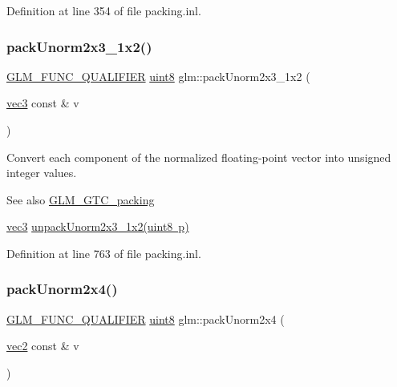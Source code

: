 Definition at line 354 of file packing.\+inl.

\mbox{\label{group__gtc__packing_ga0acca4eb99c300fe2edeef7ebd8fa08b}} 
\subsubsection{\texorpdfstring{packUnorm2x3\_1x2()}{packUnorm2x3\_1x2()}}
{\footnotesize\ttfamily \mbox{\hyperlink{setup_8hpp_a33fdea6f91c5f834105f7415e2a64407}{G\+L\+M\+\_\+\+F\+U\+N\+C\+\_\+\+Q\+U\+A\+L\+I\+F\+I\+ER}} \mbox{\hyperlink{group__gtc__type__precision_ga1a7dcd8aac97cc8020817c94049deff2}{uint8}} glm\+::pack\+Unorm2x3\+\_\+1x2 (\begin{DoxyParamCaption}\item[{\mbox{\hyperlink{group__core__types_ga1c47e8b3386109bc992b6c48e91b0be7}{vec3}} const \&}]{v }\end{DoxyParamCaption})}

Convert each component of the normalized floating-\/point vector into unsigned integer values.

\begin{DoxySeeAlso}{See also}
\mbox{\hyperlink{group__gtc__packing}{G\+L\+M\+\_\+\+G\+T\+C\+\_\+packing}} 

\mbox{\hyperlink{group__core__types_ga1c47e8b3386109bc992b6c48e91b0be7}{vec3}} \mbox{\hyperlink{group__gtc__packing_gaeeacc5275329100c50fe8fc0871eb423}{unpack\+Unorm2x3\+\_\+1x2(uint8 p)}} 
\end{DoxySeeAlso}


Definition at line 763 of file packing.\+inl.

\mbox{\label{group__gtc__packing_gad68eb2f848ba867192b8787998c0595a}} 
\subsubsection{\texorpdfstring{packUnorm2x4()}{packUnorm2x4()}}
{\footnotesize\ttfamily \mbox{\hyperlink{setup_8hpp_a33fdea6f91c5f834105f7415e2a64407}{G\+L\+M\+\_\+\+F\+U\+N\+C\+\_\+\+Q\+U\+A\+L\+I\+F\+I\+ER}} \mbox{\hyperlink{group__gtc__type__precision_ga1a7dcd8aac97cc8020817c94049deff2}{uint8}} glm\+::pack\+Unorm2x4 (\begin{DoxyParamCaption}\item[{\mbox{\hyperlink{group__core__types_gaa1618f51db67eaa145db101d8c8431d8}{vec2}} const \&}]{v }\end{DoxyParamCaption})}

